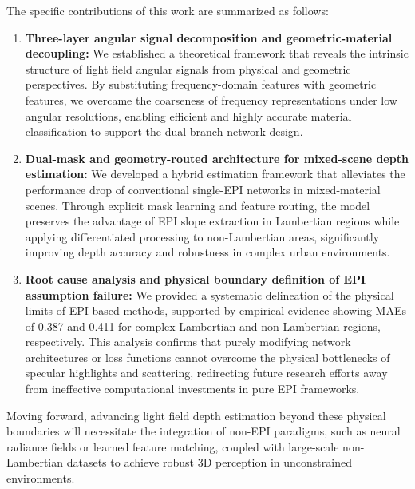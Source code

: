 \documentclass[lettersize,journal]{IEEEtran}
\begin{document}
The specific contributions of this work are summarized as follows:
\begin{enumerate}
\item \textbf{Three-layer angular signal decomposition and geometric-material decoupling:} We established a theoretical framework that reveals the intrinsic structure of light field angular signals from physical and geometric perspectives. By substituting frequency-domain features with geometric features, we overcame the coarseness of frequency representations under low angular resolutions, enabling efficient and highly accurate material classification to support the dual-branch network design.
\item \textbf{Dual-mask and geometry-routed architecture for mixed-scene depth estimation:} We developed a hybrid estimation framework that alleviates the performance drop of conventional single-EPI networks in mixed-material scenes. Through explicit mask learning and feature routing, the model preserves the advantage of EPI slope extraction in Lambertian regions while applying differentiated processing to non-Lambertian areas, significantly improving depth accuracy and robustness in complex urban environments.
\item \textbf{Root cause analysis and physical boundary definition of EPI assumption failure:} We provided a systematic delineation of the physical limits of EPI-based methods, supported by empirical evidence showing MAEs of 0.387 and 0.411 for complex Lambertian and non-Lambertian regions, respectively. This analysis confirms that purely modifying network architectures or loss functions cannot overcome the physical bottlenecks of specular highlights and scattering, redirecting future research efforts away from ineffective computational investments in pure EPI frameworks.
\end{enumerate}

Moving forward, advancing light field depth estimation beyond these physical boundaries will necessitate the integration of non-EPI paradigms, such as neural radiance fields or learned feature matching, coupled with large-scale non-Lambertian datasets to achieve robust 3D perception in unconstrained environments.
\end{document}
